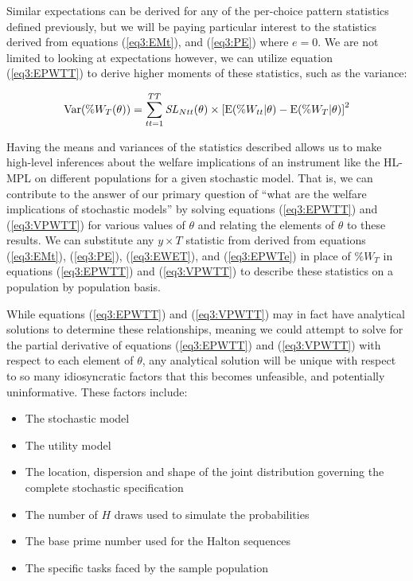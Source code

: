 \documentclass[../main.tex]{subfiles}
\begin{document}
Similar expectations can be derived for any of the per-choice pattern statistics defined previously, but we will be paying particular interest to the statistics derived from equations (\ref{eq3:EMt}), and (\ref{eq3:PE}) where $e=0$.
We are not limited to looking at expectations however, we can utilize equation (\ref{eq3:EPWTT}) to derive higher moments of these statistics, such as the variance:

\begin{equation}
	\label{eq3:VPWTT}
	\operatorname{Var}(\%W_T(\theta)) = \sum_{tt=1}^{TT} \mathit{SL}_{Ntt}(\theta) \times \left[ \operatorname{E}(\%W_{tt} | \theta) - \operatorname{E}(\%W_T | \theta) \right]^2
\end{equation}

Having the means and variances of the statistics described allows us to make high-level inferences about the welfare implications of an instrument like the HL-MPL on different populations for a given stochastic model.
That is, we can contribute to the answer of our primary question of \enquote{what are the welfare implications of stochastic models} by solving equations (\ref{eq3:EPWTT}) and (\ref{eq3:VPWTT}) for various values of $\theta$ and relating the elements of $\theta$ to these results.
We can substitute any  $y \times T$ statistic from derived from equations (\ref{eq3:EMt}), (\ref{eq3:PE}), (\ref{eq3:EWET}), and (\ref{eq3:EPWTe}) in place of $\%W_T$ in equations (\ref{eq3:EPWTT}) and (\ref{eq3:VPWTT}) to describe these statistics on a population by population basis.

While equations (\ref{eq3:EPWTT}) and (\ref{eq3:VPWTT}) may in fact have analytical solutions to determine these relationships, meaning we could attempt to solve for the partial derivative of equations (\ref{eq3:EPWTT}) and (\ref{eq3:VPWTT}) with respect to each element of $\theta$, any analytical solution will be unique with respect to so many idiosyncratic factors that this becomes unfeasible, and potentially uninformative.
These factors include:
\begin{itemize}
 \setlength\itemsep{-.25em}
	\item The stochastic model
	\item The utility model
	\item The location, dispersion and shape of the joint distribution governing the complete stochastic specification
	\item The number of $H$ draws used to simulate the probabilities
	\item The base prime number used for the Halton sequences
	\item The specific tasks faced by the sample population
\end{itemize}
\end{document}
